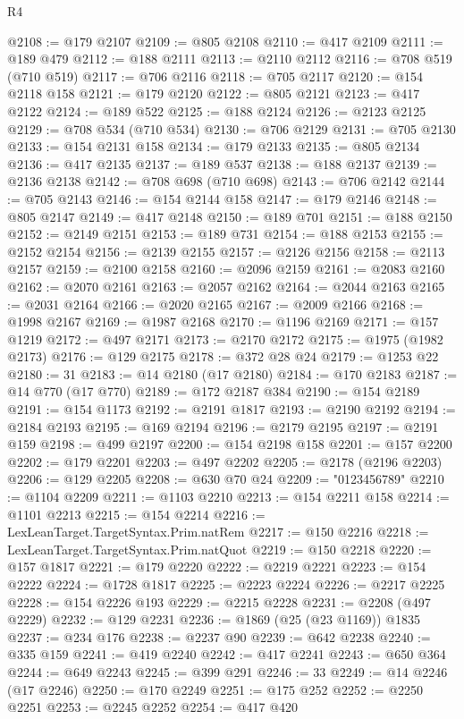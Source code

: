 \begin{lexlean}{R4}
\begin{coremodule}
@2108 := @179 @2107
@2109 := @805 @2108
@2110 := @417 @2109
@2111 := @189 @479
@2112 := @188 @2111
@2113 := @2110 @2112
@2116 := @708 @519 (@710 @519)
@2117 := @706 @2116
@2118 := @705 @2117
@2120 := @154 @2118 @158
@2121 := @179 @2120
@2122 := @805 @2121
@2123 := @417 @2122
@2124 := @189 @522
@2125 := @188 @2124
@2126 := @2123 @2125
@2129 := @708 @534 (@710 @534)
@2130 := @706 @2129
@2131 := @705 @2130
@2133 := @154 @2131 @158
@2134 := @179 @2133
@2135 := @805 @2134
@2136 := @417 @2135
@2137 := @189 @537
@2138 := @188 @2137
@2139 := @2136 @2138
@2142 := @708 @698 (@710 @698)
@2143 := @706 @2142
@2144 := @705 @2143
@2146 := @154 @2144 @158
@2147 := @179 @2146
@2148 := @805 @2147
@2149 := @417 @2148
@2150 := @189 @701
@2151 := @188 @2150
@2152 := @2149 @2151
@2153 := @189 @731
@2154 := @188 @2153
@2155 := @2152 @2154
@2156 := @2139 @2155
@2157 := @2126 @2156
@2158 := @2113 @2157
@2159 := @2100 @2158
@2160 := @2096 @2159
@2161 := @2083 @2160
@2162 := @2070 @2161
@2163 := @2057 @2162
@2164 := @2044 @2163
@2165 := @2031 @2164
@2166 := @2020 @2165
@2167 := @2009 @2166
@2168 := @1998 @2167
@2169 := @1987 @2168
@2170 := @1196 @2169
@2171 := @157 @1219
@2172 := @497 @2171
@2173 := @2170 @2172
@2175 := @1975 (@1982 @2173)
@2176 := @129 @2175
@2178 := @372 @28 @24
@2179 := @1253 @22
@2180 := 31
@2183 := @14 @2180 (@17 @2180)
@2184 := @170 @2183
@2187 := @14 @770 (@17 @770)
@2189 := @172 @2187 @384
@2190 := @154 @2189
@2191 := @154 @1173
@2192 := @2191 @1817
@2193 := @2190 @2192
@2194 := @2184 @2193
@2195 := @169 @2194
@2196 := @2179 @2195
@2197 := @2191 @159
@2198 := @499 @2197
@2200 := @154 @2198 @158
@2201 := @157 @2200
@2202 := @179 @2201
@2203 := @497 @2202
@2205 := @2178 (@2196 @2203)
@2206 := @129 @2205
@2208 := @630 @70 @24
@2209 := "0123456789"
@2210 := @1104 @2209
@2211 := @1103 @2210
@2213 := @154 @2211 @158
@2214 := @1101 @2213
@2215 := @154 @2214
@2216 := LexLeanTarget.TargetSyntax.Prim.natRem
@2217 := @150 @2216
@2218 := LexLeanTarget.TargetSyntax.Prim.natQuot
@2219 := @150 @2218
@2220 := @157 @1817
@2221 := @179 @2220
@2222 := @2219 @2221
@2223 := @154 @2222
@2224 := @1728 @1817
@2225 := @2223 @2224
@2226 := @2217 @2225
@2228 := @154 @2226 @193
@2229 := @2215 @2228
@2231 := @2208 (@497 @2229)
@2232 := @129 @2231
@2236 := @1869 (@25 (@23 @1169)) @1835
@2237 := @234 @176
@2238 := @2237 @90
@2239 := @642 @2238
@2240 := @335 @159
@2241 := @419 @2240
@2242 := @417 @2241
@2243 := @650 @364
@2244 := @649 @2243
@2245 := @399 @291
@2246 := 33
@2249 := @14 @2246 (@17 @2246)
@2250 := @170 @2249
@2251 := @175 @252
@2252 := @2250 @2251
@2253 := @2245 @2252
@2254 := @417 @420

\end{coremodule}
\end{lexlean}
